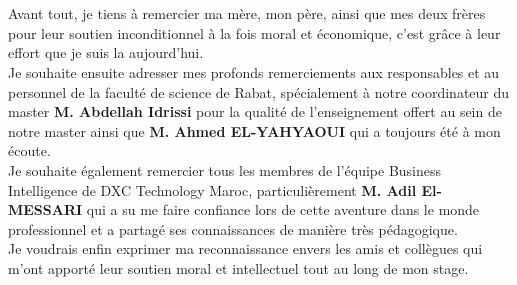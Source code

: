 \titleformat{\chapter}[display]
{\normalfont\huge\bfseries}{\filcenter\underline{\MakeUppercase{{\chaptertitlename}}\ \thechapter}}{20pt}{\Huge}

\titlespacing*{\chapter}{0pt}{1.80in}{0in}
\chapter*{}
\titlespacing*{\chapter}{0pt}{0.45in}{0.3in}%
\vspace{1in}


Avant tout, je tiens à remercier ma mère, mon père, ainsi que mes deux frères pour leur soutien inconditionnel à la fois moral et économique, c’est  grâce à leur effort que je suis la aujourd’hui. \\

Je souhaite ensuite adresser mes profonds remerciements aux responsables et au personnel de la faculté de science de Rabat, spécialement à notre coordinateur du master \textbf{M. Abdellah Idrissi} pour la qualité de l’enseignement offert au sein de notre master ainsi que \textbf{M. Ahmed EL-YAHYAOUI} qui a toujours été à mon écoute. 
\\

Je souhaite également remercier tous les membres de l’équipe Business Intelligence de DXC Technology Maroc, particulièrement \textbf{M. Adil El-MESSARI} qui a su me faire confiance lors de cette aventure dans le monde professionnel et a partagé ses connaissances de manière très pédagogique.\\ %

Je voudrais enfin exprimer ma reconnaissance envers les amis et collègues qui m’ont apporté leur soutien moral et intellectuel tout au long de mon stage.



